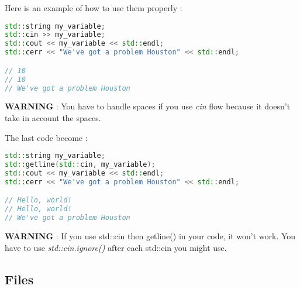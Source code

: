 \documentclass[a4paper, 12pt, titlepage]{scrartcl} %
\begin{document}
\vspace{5mm}

Here is an example of how to use them properly :
\begin{lstlisting}[language=C++]
std::string my_variable;
std::cin >> my_variable;
std::cout << my_variable << std::endl;
std::cerr << "We've got a problem Houston" << std::endl;

// 10
// 10
// We've got a problem Houston
\end{lstlisting} \vspace{5mm}

\textbf{WARNING} : You have to handle spaces if you use \textit{cin} flow because it doesn't take in account the spaces.

The last code become :
\begin{lstlisting}[language=C++]
std::string my_variable;
std::getline(std::cin, my_variable);
std::cout << my_variable << std::endl;
std::cerr << "We've got a problem Houston" << std::endl;

// Hello, world!
// Hello, world!
// We've got a problem Houston
\end{lstlisting} \vspace{5mm}

\textbf{WARNING} : If you use std::cin then getline() in your code, it won't work. You have to use \textit{std::cin.ignore()} after each std::cin you might use.


\subsection{Files}
\end{document}
